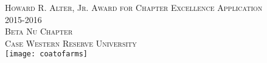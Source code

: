 \documentclass[oneside,openany]{book}
\begin{document}
  \begin{titlepage}
    \begin{center}
      \textsc{\Huge Howard R. Alter, Jr. Award for Chapter Excellence Application } \\[0.5cm]
      \textsc{\Huge 2015-2016} \\[1.0cm]
      \textsc{\Large Beta Nu Chapter} \\[0.3cm]
      \textsc{\Large Case Western Reserve University} \\[4.0cm]
      \texttt{[image: coatofarms]}
    \end{center}
  \end{titlepage}

  \tableofcontents

  \frontmatter
    

  \mainmatter
    
    
    
    
    
    
    
    
    
    
    
    
    
\end{document}
